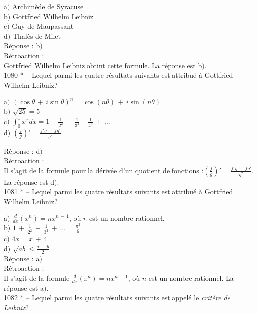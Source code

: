 ﻿\documentclass[letterpaper, 12pt]{article}
\begin{document}
a$)$ Archim\`ede de Syracuse \\
b$)$ Gottfried Wilhelm Leibniz \\
c$)$ Guy de Maupassant \\
d$)$ Thal\`es de Milet\\

R\'eponse : b$)$\\

R\'etroaction : \\
Gottfried Wilhelm Leibniz obtint cette formule.
La r\'eponse est b$)$.\\

1080 * -- Lequel parmi les quatre r\'esultats suivants est
attribu\'e \`a Gottfried Wilhelm Leibniz?

a$)$
$(\cos\theta\,+\,i\sin\theta)^n=\cos(n\theta)\,+\,i\sin(n\theta)$
\\ [2mm] b$)$ $\sqrt{25}=5$ \\ [3 mm] c$)$
$\int_0^1x^xdx=1-\frac1{2^2}\,+\,\frac1{3^3}-\frac1{4^4}\,+\,\ldots$ \\
[2mm] d$)$ $\left(\frac fg\right)'=\frac{f'g\,-\,fg'}{g^2}$

R\'eponse : d$)$\\

R\'etroaction : \\
Il s'agit de la formule pour la d\'eriv\'ee d'un quotient de
fonctions :$\left(\frac fg\right)'=\frac{f'g\,-\,fg'}{g^2}$.
La r\'eponse est d$)$.\\

1081 * -- Lequel parmi les quatre r\'esultats suivants est
attribu\'e \`a Gottfried Wilhelm Leibniz?

a$)$ $\frac d{dx}(x^n)=nx^{n\,-\,1}$, o\`u $n$ est un nombre
rationnel.
\\ [2mm] b$)$ $1\,+\,\frac1{2^2}\,+\,\frac1{3^2}\,+\,\ldots=\frac{\pi^2}6$
\\ [3 mm] c$)$ $4x=x\,+\,4$ \\ [2mm]
d$)$ $\sqrt{ab}\le\frac{a\,+\,b}2$\\

R\'eponse : a$)$\\

R\'etroaction : \\
Il s'agit de la formule $\frac d{dx}(x^n)=nx^{n\,-\,1}$, o\`u $n$
est un nombre rationnel.
La r\'eponse est a$)$.\\

1082 * -- Lequel parmi les quatre r\'esultats suivants est appel\'e
le {\sl crit\`ere de Leibniz}?
\end{document}

